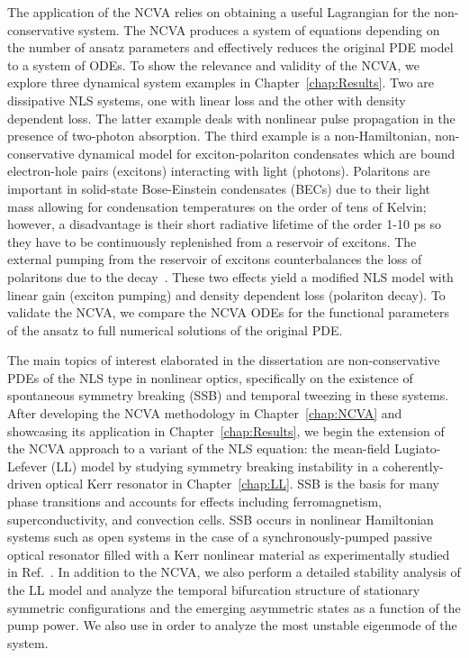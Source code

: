 The application of the NCVA relies on obtaining a useful Lagrangian for the non-conservative system.  The NCVA produces a system of equations depending on the number of ansatz parameters and effectively reduces the original PDE model to a system of ODEs.  To show the relevance and validity of the NCVA, we explore three dynamical system examples in Chapter~\ref{chap:Results}.  Two are dissipative NLS systems, one with linear loss and the other with density dependent loss.  The latter example deals with nonlinear pulse propagation in the presence of two-photon absorption.  The third example is a non-Hamiltonian, non-conservative dynamical model for exciton-polariton condensates which are bound electron-hole pairs (excitons) interacting with light (photons).  Polaritons are important in solid-state Bose-Einstein condensates (BECs) due to their light mass allowing for condensation temperatures on the order of tens of Kelvin; however, a disadvantage is their short radiative lifetime of the order 1-10 ps so they have to be continuously replenished from a reservoir of excitons.  The external pumping from the reservoir of excitons counterbalances the loss of polaritons due to the decay~\cite{Cuevas2011}.  These two effects yield a modified NLS model with linear gain (exciton pumping) and density dependent loss (polariton decay).  To validate the NCVA, we compare the NCVA ODEs for the functional parameters of the ansatz to full numerical solutions of the original PDE.  

The main topics of interest elaborated in the dissertation are non-conservative PDEs of the NLS type in nonlinear optics, specifically on the existence of spontaneous symmetry breaking  (SSB) and temporal tweezing in these systems.  After developing the NCVA methodology in Chapter~\ref{chap:NCVA} and showcasing its application in Chapter~\ref{chap:Results}, we begin the extension of the NCVA approach to a variant of the NLS equation: the mean-field Lugiato-Lefever (LL) model by studying symmetry breaking instability in a coherently-driven optical Kerr resonator in Chapter~\ref{chap:LL}.  SSB is the basis for many phase transitions and accounts for effects including ferromagnetism, superconductivity, and convection cells.  SSB occurs in nonlinear Hamiltonian systems such as open systems in the case of a  synchronously-pumped passive optical resonator filled with a Kerr 
nonlinear material as experimentally studied in Ref.~\cite{XuCoen}.  In addition to the NCVA, we also perform a detailed stability analysis of the LL model and analyze the temporal bifurcation structure of stationary symmetric configurations and the emerging asymmetric states as a function of the pump power.  We also use  in order to analyze the most unstable eigenmode of the system.  

